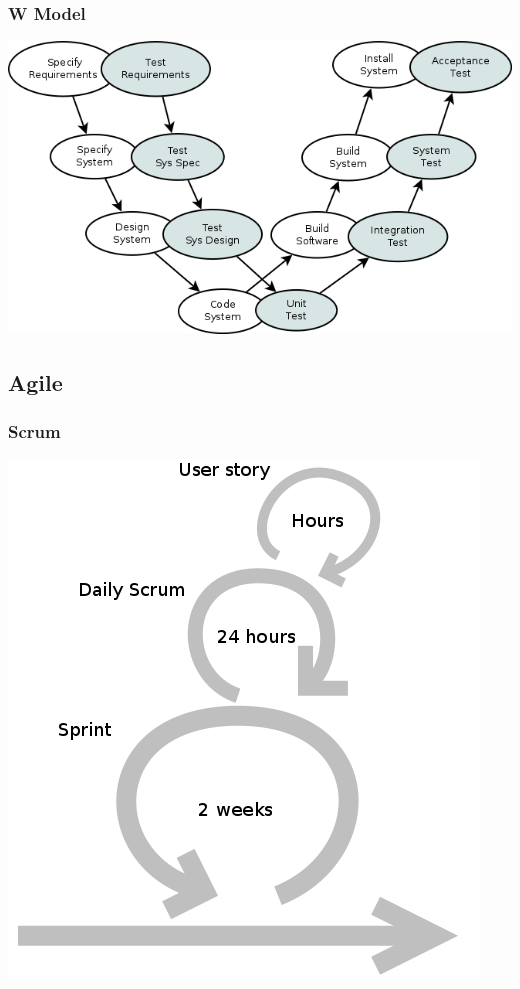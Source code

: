 \begin{frame}
    \frametitle{W Model}
    \centering
    \includegraphics[scale=0.4]{w_model.png}
\end{frame}

\subsection{Agile}
\begin{frame}
    \frametitle{Scrum}
    \centering
    \includegraphics[scale=0.35]{scrum.png}
\end{frame}

